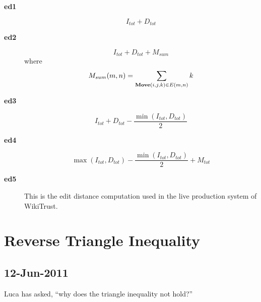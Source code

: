 \begin{description}

\item[\textbf{ed1}]
    \begin{equation*}
    I_{tot} + D_{tot}
    \end{equation*}
\item[\textbf{ed2}]
    \begin{equation*}
    I_{tot} + D_{tot} + M_{sum}
    \end{equation*}
    where
    \begin{equation*}
    M_{sum}(m,n) = \sum_{\mathbf{Move}(i, j, k) \in E(m,n)} k \\
    \end{equation*}
\item[\textbf{ed3}]
    \begin{equation*}
    I_{tot} + D_{tot} - \frac{\min(I_{tot}, D_{tot})}{2}
    \end{equation*}

\item[\textbf{ed4}]
    \begin{equation*}
    \max(I_{tot}, D_{tot}) - \frac{\min(I_{tot}, D_{tot})}{2}
                + M_{tot}
    \end{equation*}

\item[\textbf{ed5}] This is the edit distance computation used
    in the live production system of WikiTrust.

\end{description}






\section{Reverse Triangle Inequality}

\subsection{12-Jun-2011}

Luca has asked, ``why does the triangle inequality not hold?''


